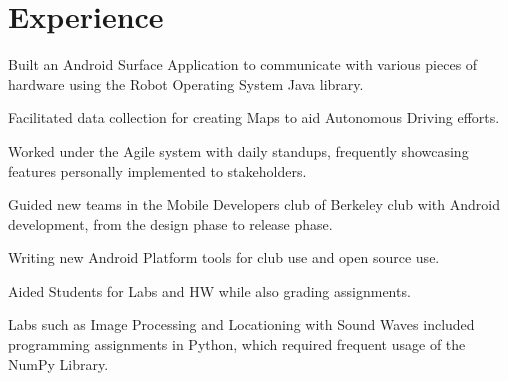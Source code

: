 \documentclass[]{format}
\begin{document}
\begin{minipage}[t]{0.66\textwidth} 


\section{Experience}

\vspace{\topsep} %
\begin{tightemize}
\item Built an Android Surface Application to communicate with various pieces of hardware using the Robot
Operating System Java library.
\item Facilitated data collection for creating Maps to aid Autonomous Driving efforts.
\item Worked under the Agile system with daily standups, frequently showcasing features personally implemented to stakeholders.
\end{tightemize}
\sectionsep

\begin{tightemize}
\item Guided new teams in the Mobile Developers club of Berkeley club with Android development, from the design phase
to release phase.
\item Writing new Android Platform tools for club use and open source use.
\end{tightemize}
\sectionsep

\begin{tightemize}
\item Aided Students for Labs and HW while also grading assignments.
\item Labs such as Image Processing and Locationing with Sound Waves included programming assignments in Python, which required frequent usage of the NumPy Library.
\end{tightemize}
\sectionsep



\end{minipage}
\end{document}
